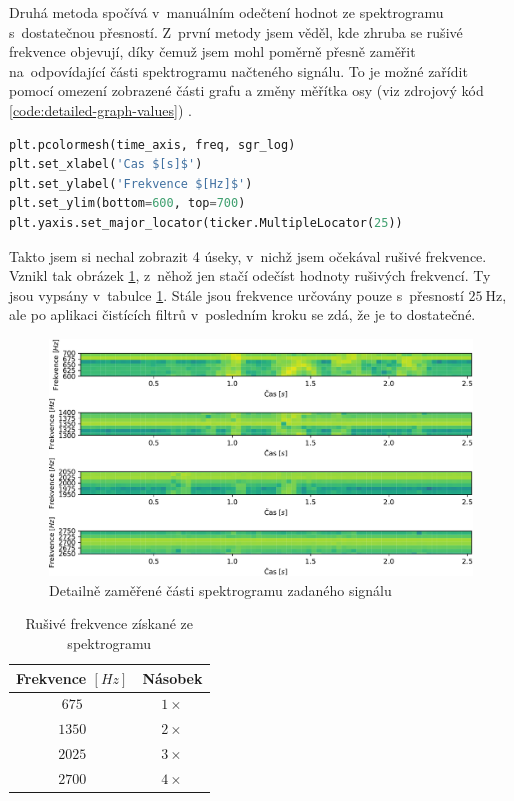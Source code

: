 \documentclass[a4paper, 11pt, final]{article}
\begin{document}
Druhá metoda spočívá v~manuálním odečtení hodnot ze spektrogramu s~dostatečnou přesností. Z~první metody jsem věděl, kde zhruba se rušivé frekvence objevují, díky čemuž jsem mohl poměrně přesně zaměřit na~odpovídající části spektrogramu načteného signálu. To je možné zařídit pomocí omezení zobrazené části grafu a změny měřítka osy (viz zdrojový kód \ref{code:detailed-graph-values}) \cite{matplotlib-reference}.

\begin{lstlisting}[language=Python, caption=Zobrazení detailního pohledu na spektrogram, label={code:detailed-graph-values}]
plt.pcolormesh(time_axis, freq, sgr_log)
plt.set_xlabel('Cas $[s]$')
plt.set_ylabel('Frekvence $[Hz]$')
plt.set_ylim(bottom=600, top=700)
plt.yaxis.set_major_locator(ticker.MultipleLocator(25))
\end{lstlisting}

Takto jsem si nechal zobrazit 4 úseky, v~nichž jsem očekával rušivé frekvence. Vznikl tak obrázek \ref{fig:detailed-spectrogram}, z~něhož jen stačí odečíst hodnoty rušivých frekvencí. Ty jsou vypsány v~tabulce \ref{tab:freq-list-2nd-method}. Stále jsou frekvence určovány pouze s~přesností $\SI{25}{\hertz}$, ale po aplikaci čistících filtrů v~posledním kroku se zdá, že je to dostatečné.

\begin{figure}[ht]
    \centering
    \includegraphics[width=\textwidth]{img/05-detailed-spectrogram.pdf}
    \caption{Detailně zaměřené části spektrogramu zadaného signálu}
    \label{fig:detailed-spectrogram}
\end{figure}

\begin{table}[ht]
    \centering
    \begin{tabular}{|c|c|}
        \hline
        \textbf{Frekvence $[\si{Hz}]$} & \textbf{Násobek} \\
        \hline
        $675$ & $1\times$ \\
        $1350$ & $2\times$ \\
        $2025$ & $3\times$ \\
        $2700$ & $4\times$ \\
        \hline
    \end{tabular}
    \caption{Rušivé frekvence získané ze spektrogramu}
    \label{tab:freq-list-2nd-method}
\end{table}
\end{document}

